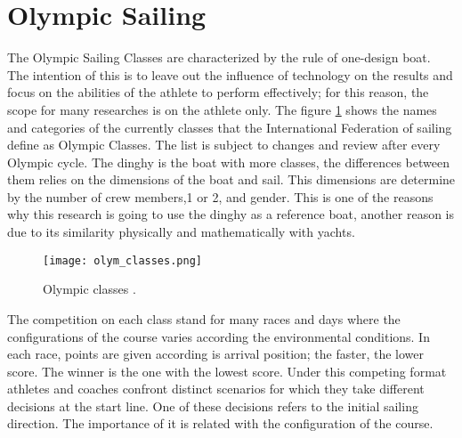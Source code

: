 \section {Olympic Sailing} \label{sec:olympic classes}
The Olympic Sailing Classes are characterized by the rule of one-design boat. The intention of this is to leave out the influence of technology on the results and focus on the abilities of the athlete to perform effectively; for this reason, the scope for many researches is on the athlete only. The figure \ref{fig:olymp_cla} shows the names and categories of the currently classes that the International Federation of sailing define as Olympic Classes. The list is subject to changes and review after every Olympic cycle. The dinghy is the boat with more classes, the differences between them relies on the dimensions of the boat and sail. This dimensions are determine by the number of crew members,1 or 2, and gender. This is one of the reasons why this research is going to use the dinghy as a reference boat, another reason is due to its similarity physically and mathematically with yachts.\\

\begin{figure}[ht]
\centering
 \texttt{[image: olym\_classes.png]}
  \caption{Olympic classes \cite{sailoly}.}
\label{fig:olymp_cla} 
\end{figure}

The competition on each class stand for many races and days where the configurations of the course varies according the environmental conditions. In each race, points are given according is arrival position; the faster, the lower score. The winner is the one with the lowest score. Under this competing format athletes and coaches confront distinct scenarios for which they take different decisions at the start line. One of these decisions refers to the initial sailing direction. The importance of it is related with the configuration of the course.\\

